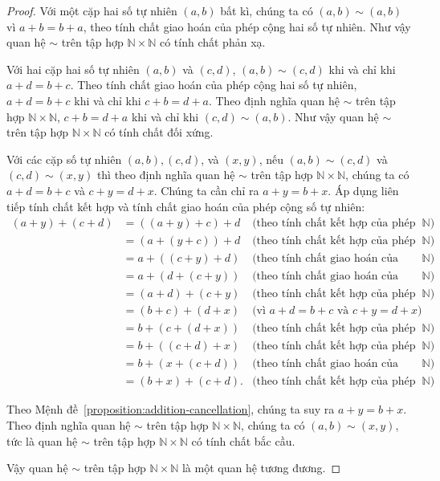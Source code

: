 \begin{proof}
	Với một cặp hai số tự nhiên $(a, b)$ bất kì, chúng ta có $(a, b)\sim (a, b)$ vì $a + b = b + a$, theo tính chất giao hoán của phép cộng hai số tự nhiên. Như vậy quan hệ $\sim$ trên tập hợp $\mathbb{N}\times\mathbb{N}$ có tính chất phản xạ.

	Với hai cặp hai số tự nhiên $(a, b)$ và $(c, d)$, $(a, b)\sim (c, d)$ khi và chỉ khi $a + d = b + c$. Theo tính chất giao hoán của phép cộng hai số tự nhiên, $a + d = b + c$ khi và chỉ khi $c + b = d + a$. Theo định nghĩa quan hệ $\sim$ trên tập hợp $\mathbb{N}\times\mathbb{N}$, $c + b = d + a$ khi và chỉ khi $(c, d)\sim (a, b)$. Như vậy quan hệ $\sim$ trên tập hợp $\mathbb{N}\times\mathbb{N}$ có tính chất đối xứng.

	Với các cặp số tự nhiên $(a, b), (c, d)$, và $(x, y)$, nếu $(a, b)\sim (c, d)$ và $(c, d)\sim (x, y)$ thì theo định nghĩa quan hệ $\sim$ trên tập hợp $\mathbb{N}\times\mathbb{N}$, chúng ta có $a + d = b + c$ và $c + y = d + x$. Chúng ta cần chỉ ra $a + y = b + x$. Áp dụng liên tiếp tính chất kết hợp và tính chất giao hoán của phép cộng số tự nhiên:
	\begin{align*}
		(a + y) + (c + d) & = ((a + y) + c) + d  & \text{(theo tính chất kết hợp của phép cộng trên $\mathbb{N}$)}   \\
		                  & = (a + (y + c)) + d  & \text{(theo tính chất kết hợp của phép cộng trên $\mathbb{N}$)}   \\
		                  & = a + ((c + y) + d)  & \text{(theo tính chất giao hoán của phép cộng trên $\mathbb{N}$)} \\
		                  & = a + (d + (c + y))  & \text{(theo tính chất giao hoán của phép cộng trên $\mathbb{N}$)} \\
		                  & = (a + d) + (c + y)  & \text{(theo tính chất kết hợp của phép cộng trên $\mathbb{N}$)}   \\
		                  & = (b + c) + (d + x)  & \text{(vì $a + d = b + c$ và $c  + y = d + x$)}                   \\
		                  & = b + (c + (d + x))  & \text{(theo tính chất kết hợp của phép cộng trên $\mathbb{N}$)}   \\
		                  & = b + ((c + d) + x)  & \text{(theo tính chất kết hợp của phép cộng trên $\mathbb{N}$)}   \\
		                  & = b + (x + (c + d))  & \text{(theo tính chất giao hoán của phép cộng trên $\mathbb{N}$)} \\
		                  & = (b + x) + (c + d). & \text{(theo tính chất kết hợp của phép cộng trên $\mathbb{N}$)}
	\end{align*}

	Theo Mệnh đề~\ref{proposition:addition-cancellation}, chúng ta suy ra $a + y = b + x$. Theo định nghĩa quan hệ $\sim$ trên tập hợp $\mathbb{N}\times\mathbb{N}$, chúng ta có $(a, b)\sim (x, y)$, tức là quan hệ $\sim$ trên tập hợp $\mathbb{N}\times\mathbb{N}$ có tính chất bắc cầu.

	Vậy quan hệ $\sim$ trên tập hợp $\mathbb{N}\times\mathbb{N}$ là một quan hệ tương đương.
\end{proof}

